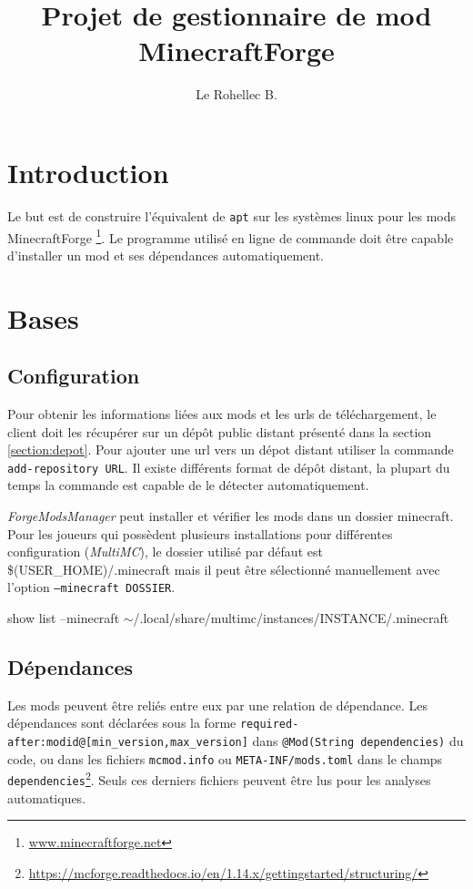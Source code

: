 \documentclass{article}
\title{Projet de gestionnaire de mod MinecraftForge}
\author{Le Rohellec B.}
\newenvironment{code}{%
\par
\vspace{3mm}
\ttfamily
}{%
\normalfont
\vspace{3mm}
\par
}
\begin{document}
\maketitle
\tableofcontents
\newpage


\section*{Introduction}
Le but est de construire l'équivalent de \texttt{apt} sur les systèmes linux pour les mods MinecraftForge \footnote{\url{www.minecraftforge.net}}.
Le programme utilisé en ligne de commande doit être capable d'installer un mod et ses dépendances automatiquement.

%
%
\section{Bases}
\label{section:bases}
\subsection{Configuration}
Pour obtenir les informations liées aux mods et les urls de téléchargement, le client doit les récupérer sur un dépôt public distant présenté dans la section \ref{section:depot}.
Pour ajouter une url vers un dépot distant utiliser la commande \texttt{add-repository URL}.
Il existe différents format de dépôt distant, la plupart du temps la commande est capable de le détecter automatiquement.

\textit{ForgeModsManager} peut installer et vérifier les mods dans un dossier minecraft.
Pour les joueurs qui possèdent plusieurs installations pour différentes configuration (\textit{MultiMC}), le dossier utilisé par défaut est \textsf{\$(USER\_HOME)/.minecraft} mais il peut être sélectionné manuellement avec l'option \texttt{--minecraft DOSSIER}.

\begin{code}
	show list --minecraft $\sim$/.local/share/multimc/instances/INSTANCE/.minecraft
\end{code}

\subsection{Dépendances}
Les mods peuvent être reliés entre eux par une relation de dépendance.
Les dépendances sont déclarées sous la forme \verb|required-after:modid@[min_version,max_version]| dans \verb|@Mod(String dependencies)| du code, ou dans les fichiers \texttt{mcmod.info} ou \texttt{META-INF/mods.toml} dans le champs \texttt{dependencies}\footnote{\url{https://mcforge.readthedocs.io/en/1.14.x/gettingstarted/structuring/}}.
Seuls ces derniers fichiers peuvent être lus pour les analyses automatiques.
\end{document}
